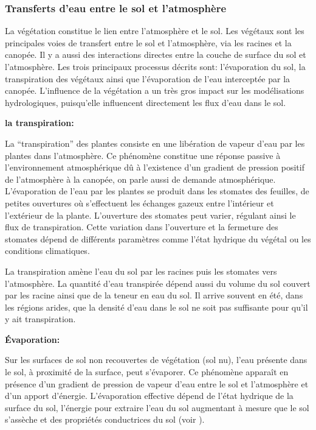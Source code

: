 \documentclass[a4paper,11pt]{article}
\numberwithin{equation}{section}
\begin{document}
\subsubsection{Transferts d'eau entre le sol et l'atmosphère}
\label{ch:mecanismes}

La végétation constitue le lien entre l'atmosphère et le sol. Les végétaux sont les principales voies de transfert entre le sol et l'atmosphère, via les racines et la canopée. Il y a aussi des interactions directes entre la couche de surface du sol et l'atmosphère. Les trois principaux processus décrits sont: l'évaporation du sol, la transpiration des végétaux ainsi que l'évaporation de l'eau interceptée par la canopée. L'influence de la végétation a un très gros impact sur les modélisations hydrologiques, puisqu'elle influencent directement les flux d'eau dans le sol. 

\vspace{0.7cm}

\noindent\textbf{la transpiration:}

La ``transpiration'' des plantes consiste en une libération de vapeur d’eau par les plantes dans l’atmosphère. Ce phénomène constitue une réponse passive à l’environnement atmosphérique dû à l’existence d’un gradient de pression positif de l’atmosphère à la canopée, on parle aussi de demande atmosphérique. L’évaporation de l’eau par les plantes se produit dans les stomates des feuilles, de petites ouvertures où s’effectuent les échanges gazeux entre l’intérieur et l’extérieur de la plante. L’ouverture des stomates peut varier, régulant ainsi le flux de transpiration. Cette variation dans l’ouverture et la fermeture des stomates dépend de différents paramètres comme l’état hydrique du végétal ou les conditions climatiques.

La transpiration amène l'eau du sol par les racines puis les stomates vers l'atmosphère. La quantité d'eau transpirée dépend aussi du volume du sol couvert par les racine ainsi que de la teneur en eau du sol. Il arrive souvent en été, dans les régions arides, que la densité d'eau dans le sol ne soit pas suffisante pour qu'il y ait transpiration.

\vspace{0.7cm}

\noindent\textbf{Évaporation:}

Sur les surfaces de sol non recouvertes de végétation (sol nu), l’eau présente dans le sol, à proximité de la surface, peut s’évaporer. Ce phénomène apparaît en présence d’un gradient de pression de vapeur d’eau entre le sol et l’atmosphère et d’un apport d’énergie. L’évaporation effective dépend de l’état hydrique de la surface du sol, l’énergie pour extraire l’eau du sol augmentant à mesure que le sol s’assèche et des propriétés conductrices du sol (voir \cite{hillel2003introduction}).
\end{document}
